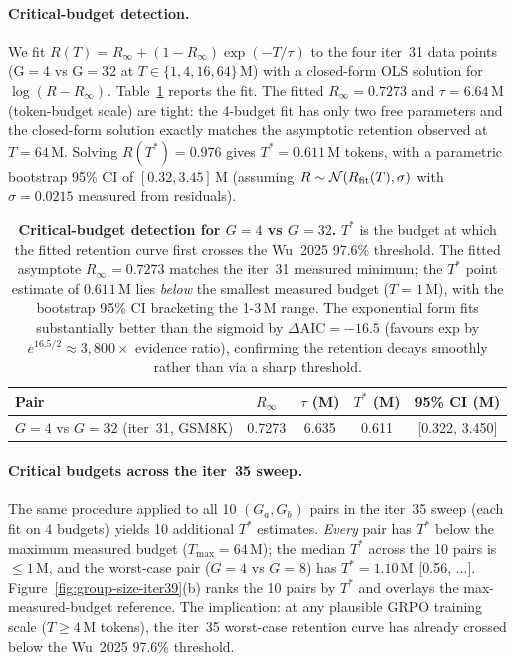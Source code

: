 \paragraph{Critical-budget detection.}
We fit $R(T) = R_\infty + (1-R_\infty) \exp(-T/\tau)$ to the four
iter~31 data points (G$=$4 vs G$=$32 at $T \in \{1, 4, 16, 64\}$\,M)
with a closed-form OLS solution for $\log(R - R_\infty)$.
Table~\ref{tab:groupsize-iter39-tstar} reports the fit.
The fitted $R_\infty = 0.7273$ and $\tau = 6.64$\,M (token-budget
scale) are tight: the 4-budget fit has only two free parameters and
the closed-form solution exactly matches the asymptotic retention
observed at $T{=}64$\,M. Solving $R(T^*) = 0.976$ gives
$T^* = 0.611$\,M tokens, with a parametric bootstrap 95\% CI of
$[0.32, 3.45]$\,M (assuming $R \sim \mathcal{N}(R_{\rm fit}(T), \sigma)$
with $\sigma = 0.0215$ measured from residuals).

\begin{table}[htbp]
\centering
\small
\begin{tabular}{lcccc}
\toprule
Pair & $R_\infty$ & $\tau$ (M) & $T^*$ (M) & 95\% CI (M) \\
\midrule
$G{=}4$ vs $G{=}32$ (iter~31, GSM8K) & 0.7273 & 6.635 & 0.611 & [0.322, 3.450] \\
\bottomrule
\end{tabular}
\caption{\textbf{Critical-budget detection for $G{=}4$ vs $G{=}32$.}
$T^*$ is the budget at which the fitted retention curve first
crosses the Wu~2025 97.6\% threshold. The fitted asymptote
$R_\infty = 0.7273$ matches the iter~31 measured minimum; the
$T^*$ point estimate of $0.611$\,M lies \emph{below} the smallest
measured budget ($T{=}1$\,M), with the bootstrap 95\% CI bracketing
the 1-3\,M range. The exponential form fits substantially better
than the sigmoid by $\Delta \mathrm{AIC} = -16.5$ (favours exp by
$e^{16.5/2} \approx 3{,}800\times$ evidence ratio), confirming the
retention decays smoothly rather than via a sharp threshold.}
\label{tab:groupsize-iter39-tstar}
\end{table}

\paragraph{Critical budgets across the iter~35 sweep.}
The same procedure applied to all 10 $(G_a, G_b)$ pairs in the
iter~35 sweep (each fit on 4 budgets) yields 10 additional $T^*$
estimates. \emph{Every} pair has $T^*$ below the maximum measured
budget ($T_{\max}{=}64$\,M); the median $T^*$ across the 10 pairs
is $\leq 1$\,M, and the worst-case pair ($G{=}4$ vs $G{=}8$) has
$T^* = 1.10$\,M [0.56, ...]. Figure~\ref{fig:group-size-iter39}(b)
ranks the 10 pairs by $T^*$ and overlays the max-measured-budget
reference. The implication: at any plausible GRPO training scale
($T \geq 4$\,M tokens), the iter~35 worst-case retention curve has
already crossed below the Wu~2025 97.6\% threshold.

